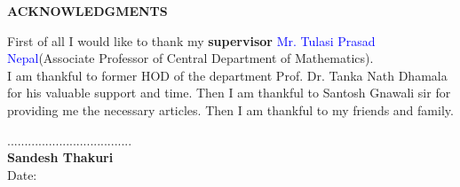
\begin{center}
{\Large{\bfseries ACKNOWLEDGMENTS}}
\end{center}

\vspace{1cm}
First of all I would like to thank my \textbf{supervisor} \textcolor{blue}{Mr. Tulasi Prasad Nepal}(Associate Professor of Central Department of Mathematics).\\

I am thankful to former HOD of the department Prof. Dr. Tanka Nath Dhamala for his valuable support and time. Then I am thankful to Santosh Gnawali sir for providing me the necessary articles. Then I am thankful to my friends and family.
\\[5cm]

\begin{minipage}{1\textwidth}
	\begin{flushright}
		....................................\\
		{\bfseries Sandesh Thakuri}\\
		Date: \thedate
	\end{flushright}
\end{minipage}

\clearpage